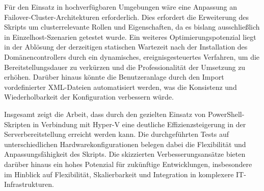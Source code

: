 \documentclass[conference]{IEEEtran}
\begin{document}
Für den Einsatz in hochverfügbaren Umgebungen wäre eine Anpassung an Failover-Cluster-Architekturen erforderlich. Dies erfordert die Erweiterung des Skripts um clusterrelevante Rollen und Eigenschaften, da es bislang ausschließlich in Einzelhost-Szenarien getestet wurde. Ein weiteres Optimierungspotenzial liegt in der Ablösung der derzeitigen statischen Wartezeit nach der Installation des Domänencontrollers durch ein dynamisches, ereignisgesteuertes Verfahren, um die Bereitstellungsdauer zu verkürzen und die Professionalität der Umsetzung zu erhöhen. Darüber hinaus könnte die Benutzeranlage durch den Import vordefinierter XML-Dateien automatisiert werden, was die Konsistenz und Wiederholbarkeit der Konfiguration verbessern würde.

Insgesamt zeigt die Arbeit, dass durch den gezielten Einsatz von PowerShell-Skripten in Verbindung mit Hyper-V eine deutliche Effizienzsteigerung in der Serverbereitstellung erreicht werden kann. Die durchgeführten Tests auf unterschiedlichen Hardwarekonfigurationen belegen dabei die Flexibilität und Anpassungsfähigkeit des Skripts. Die skizzierten Verbesserungsansätze bieten darüber hinaus ein hohes Potenzial für zukünftige Entwicklungen, insbesondere im Hinblick auf Flexibilität, Skalierbarkeit und Integration in komplexere IT-Infrastrukturen.
\newpage




\end{document}
